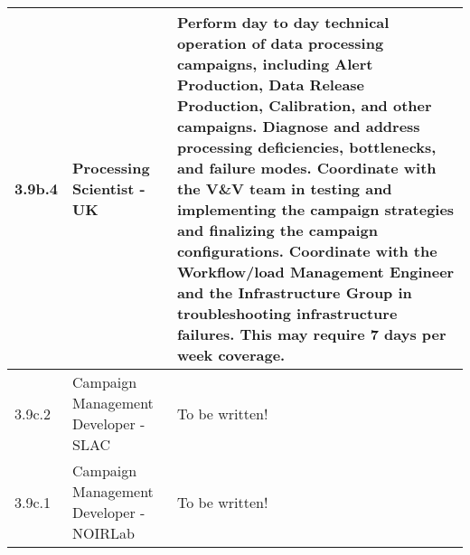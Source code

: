 \begin{longtable} {|p{}|p{}|p{}|}
{3.9b.4}&{Processing Scientist - UK}&{Perform day to day technical operation of data processing campaigns, including Alert Production, Data Release Production, Calibration, and other campaigns. Diagnose and address processing deficiencies, bottlenecks, and failure modes. Coordinate with the V\&V team in testing and implementing the campaign strategies and finalizing the campaign configurations. Coordinate with the Workflow/load Management Engineer and the Infrastructure Group in troubleshooting infrastructure failures. This may require 7 days per week coverage.} \\ \hline
{3.9c.2}&{Campaign Management Developer - SLAC}&{To be written!} \\ \hline
{3.9c.1}&{Campaign Management Developer - NOIRLab}&{To be written!} \\ \hline
\end{longtable} \normalsize
